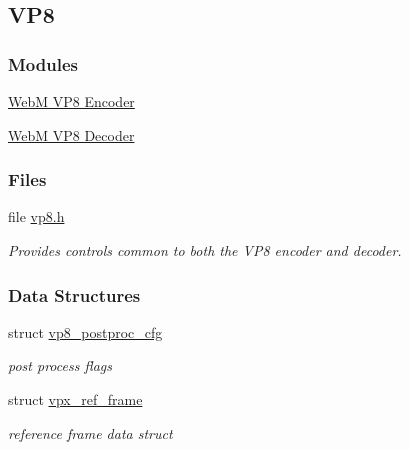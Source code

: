 \hypertarget{group__vp8}{\subsection{V\-P8}
\label{group__vp8}
}
\subsubsection*{Modules}
\begin{DoxyCompactItemize}
\item 
\hyperlink{group__vp8__encoder}{Web\-M V\-P8 Encoder}
\item 
\hyperlink{group__vp8__decoder}{Web\-M V\-P8 Decoder}
\end{DoxyCompactItemize}
\subsubsection*{Files}
\begin{DoxyCompactItemize}
\item 
file \hyperlink{vp8_8h}{vp8.\-h}
\begin{DoxyCompactList}\small\item\em Provides controls common to both the V\-P8 encoder and decoder. \end{DoxyCompactList}\end{DoxyCompactItemize}
\subsubsection*{Data Structures}
\begin{DoxyCompactItemize}
\item 
struct \hyperlink{structvp8__postproc__cfg}{vp8\-\_\-postproc\-\_\-cfg}
\begin{DoxyCompactList}\small\item\em post process flags \end{DoxyCompactList}\item 
struct \hyperlink{structvpx__ref__frame}{vpx\-\_\-ref\-\_\-frame}
\begin{DoxyCompactList}\small\item\em reference frame data struct \end{DoxyCompactList}\end{DoxyCompactItemize}
